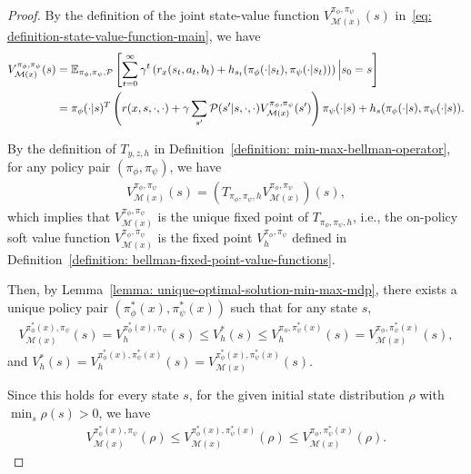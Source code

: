\documentclass{article}
\theoremstyle{plain}
\theoremstyle{definition}
\theoremstyle{remark}
\def\cM{\mathcal M}
\def\cP{\mathcal P}
\begin{document}
\begin{proof}
    By the definition of the joint state-value function $V^{\pi_\phi,\pi_\psi}_{\cM(x)}(s)$ in~\eqref{eq: definition-state-value-function-main}, we have
    \begin{align}
        V^{\pi_\phi,\pi_\psi}_{\cM(x)}(s) & = \mathbb{E}_{\pi_\phi,\pi_\psi,\cP} \left[ \sum_{t=0}^{\infty} \gamma^t \left( r_x(s_t,a_t,b_t) + h_{s_t}(\pi_\phi(\cdot|s_t),\pi_\psi(\cdot|s_t)) \right) \Big| s_0 = s \right]\notag      \\
        & = \pi_\phi(\cdot|s)^T \left( r(x,s,\cdot,\cdot) + \gamma \sum_{s^\prime} \cP(s^\prime|s,\cdot,\cdot) V^{\pi_\phi,\pi_\psi}_{\cM(x)}(s^\prime) \right) \pi_\psi(\cdot|s) + h_s(\pi_\phi(\cdot|s),\pi_\psi(\cdot|s)) \notag.
    \end{align}

By the definition of $T_{y,z,h}$ in
Definition~\ref{definition: min-max-bellman-operator}, for any policy pair
$(\pi_\phi,\pi_\psi)$, we have
    \begin{align}
        V^{\pi_\phi,\pi_\psi}_{\cM(x)}(s) = (T_{\pi_\phi,\pi_\psi,h} V^{\pi_\phi,\pi_\psi}_{\cM(x)})(s),
    \end{align}
    which implies that $V^{\pi_\phi,\pi_\psi}_{\cM(x)}$ is the unique fixed point of $T_{\pi_\phi,\pi_\psi,h}$, i.e., the on-policy soft value function $V^{\pi_\phi,\pi_\psi}_{\cM(x)}$ is the fixed point $V_h^{\pi_\phi,\pi_\psi}$ defined in Definition~\ref{definition: bellman-fixed-point-value-functions}.
    
    Then, by Lemma~\ref{lemma: unique-optimal-solution-min-max-mdp}, there exists a unique policy pair $(\pi_\phi^*(x), \pi_\psi^*(x))$ such that for any state $s$, 
    \begin{align}
        V^{\pi_\phi^*(x),\pi_\psi}_{\cM(x)}(s) = V^{\pi_\phi^*(x),\pi_\psi}_h(s) \leq V^{*}_h(s) \leq V^{\pi_\phi,\pi_\psi^*(x)}_h(s) = V^{\pi_\phi,\pi_\psi^*(x)}_{\cM(x)}(s),
    \end{align}
    and $V^*_h(s) = V^{\pi_\phi^*(x),\pi_\psi^*(x)}_h(s) = V^{\pi_\phi^*(x),\pi_\psi^*(x)}_{\cM(x)}(s)$.

Since this holds for every state $s$, for the given initial state distribution
$\rho$ with $\min_s \rho(s)>0$, we have
    \begin{align}
        V^{\pi_\phi^*(x),\pi_\psi}_{\cM(x)}(\rho) \leq V^{\pi_\phi^*(x),\pi_\psi^*(x)}_{\cM(x)}(\rho) \leq  V^{\pi_\phi,\pi_\psi^*(x)}_{\cM(x)}(\rho).
    \end{align}


\end{proof}
\end{document}
